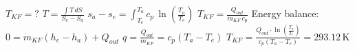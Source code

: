 \( T_{KF} = ? \)  
\( T = \frac{\int T \, dS}{S_e - S_a} \)  
\( s_a - s_e = \int_{T_e}^{T_a} c_p \, \ln \left( \frac{T_a}{T_e} \right) \)  
\( T_{KF} = \frac{Q_{out}}{\dot{m}_{KF} \, c_p} \)  
Energy balance: \( 0 = \dot{m}_{KF}(h_e - h_a) + Q_{out} \)  
\( q = \frac{Q_{out}}{\dot{m}_{KF}} = c_p(T_a - T_e) \)  
\( T_{KF} = \frac{Q_{out} \cdot \ln \left( \frac{T_a}{T_e} \right)}{c_p(T_a - T_e)} = 293.12 \, \text{K} \)